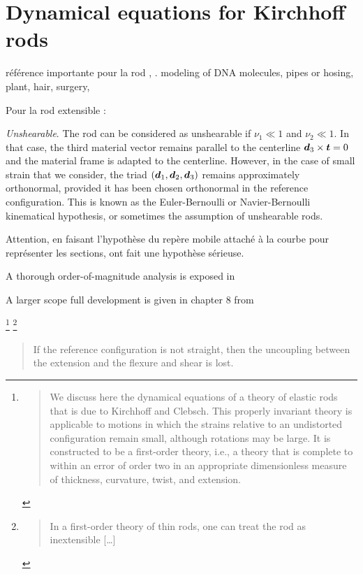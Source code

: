 \clearpage
\section{Dynamical equations for Kirchhoff rods}

référence importante pour la rod \cite{Moulton2013} , \cite[p.~109]{Villaggio1997}.
modeling of DNA molecules, pipes or hosing, plant, hair, surgery, 

Pour la rod extensible : \cite{Cisternas2002}

\emph{Unshearable}. The rod can be considered as unshearable if $\nu_1 \ll 1$ and $\nu_2 \ll 1$. In that case, the third material vector remains parallel to the centerline  $\boldsymbol{d}_3 \times \boldsymbol{t} = 0$ and the material frame is adapted to the centerline. 
However, in the case of small strain that we consider, the triad $(\boldsymbol{d}_1,\boldsymbol{d}_2,\boldsymbol{d}_3)$ remains approximately orthonormal, provided it has been chosen orthonormal in the reference configuration. This is known as the Euler-Bernoulli or Navier-Bernoulli kinematical hypothesis, or sometimes the assumption of unshearable rods. 



Attention, en faisant l'hypothèse du repère mobile attaché à la courbe pour représenter les sections, ont fait une hypothèse sérieuse.

A thorough order-of-magnitude analysis is exposed in \cite{Dill1992, Coleman1993}

A larger scope full development is given in chapter 8 from \cite[pp.~270-274]{Antman2005}

\footnote{\blockcquote[p.~1]{Coleman1993}{We discuss here the dynamical equations of a theory of elastic rods that is due to Kirchhoff and Clebsch. This properly invariant theory is applicable to motions in which the strains relative to an undistorted configuration remain small, although rotations may be large. It is constructed to be a first-order theory, i.e., a theory that is complete to within an error of order two in an appropriate dimensionless measure of thickness, curvature, twist, and extension.}}
\footnote{\blockcquote[p.~1]{Coleman1993}{In a first-order theory of thin rods, one can treat the rod as inextensible [\dots]}}



\blockcquote[p.~341]{Antman2005}{If the reference configuration is not straight, then the uncoupling between the extension and the flexure and shear is lost.}




